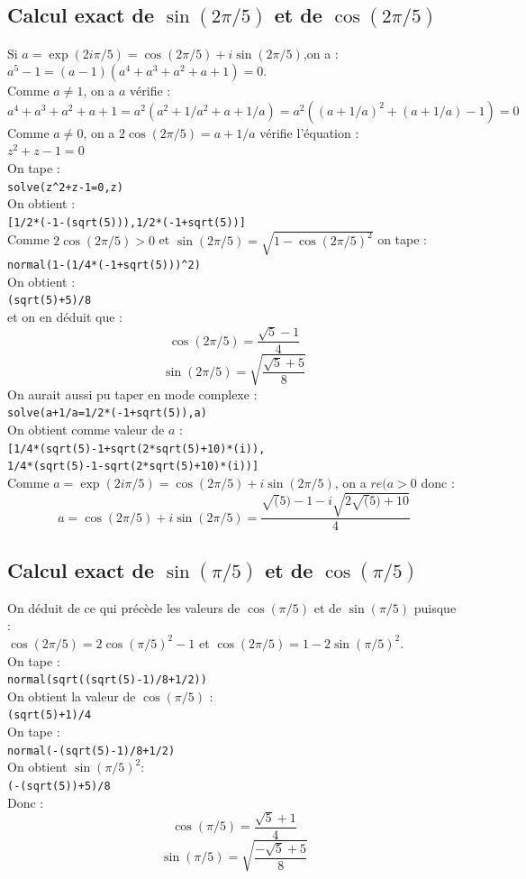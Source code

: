\documentclass[a4paper,11pt]{book}
\begin{document}
\subsection{Calcul exact de $\sin(2\pi/5)$ et de $\cos(2\pi/5)$}
Si $a=\exp(2i\pi/5)=\cos(2\pi/5)+i\sin(2\pi/5)$,on a :\\
$a^5-1=(a-1)(a^4+a^3+a^2+a+1)=0$.\\
Comme $a\neq 1$, on a $a$ v\'erifie :\\ 
$a^4+a^3+a^2+a+1=a^2(a^2+1/a^2+a+1/a)=a^2((a+1/a)^2+(a+1/a)-1)=0$\\
Comme $a\neq 0$, on a $2\cos(2\pi/5)=a+1/a$ v\'erifie l'\'equation :\\
$z^2+z-1=0$\\ 
On tape :\\
{\tt solve(z\verb|^|2+z-1=0,z)}\\
On obtient :\\
{\tt [1/2*(-1-(sqrt(5))),1/2*(-1+sqrt(5))]}\\
Comme $2\cos(2\pi/5)>0$ et $\sin(2\pi/5)=\sqrt{1-\cos(2\pi/5)^2}$ on tape :\\
{\tt normal(1-(1/4*(-1+sqrt(5)))\verb|^|2)}\\
On obtient :\\
{\tt  (sqrt(5)+5)/8}\\
et on en d\'eduit que :
$$\cos(2\pi/5)=\frac{\sqrt 5-1}{4}$$
$$\sin(2\pi/5)=\sqrt{\frac{\sqrt 5+5}{8}}$$
On aurait aussi pu taper en mode complexe :\\
{\tt solve(a+1/a=1/2*(-1+sqrt(5)),a)}\\
On obtient comme valeur de $a$ :\\
{\tt [1/4*(sqrt(5)-1+sqrt(2*sqrt(5)+10)*(i)),\\
1/4*(sqrt(5)-1-sqrt(2*sqrt(5)+10)*(i))] }\\
Comme $a=\exp(2i\pi/5)=\cos(2\pi/5)+i\sin(2\pi/5)$, on a $re(a>0$ donc :\\
$$a=\cos(2\pi/5)+i\sin(2\pi/5)=\frac{\sqrt(5)-1-i\sqrt{2\sqrt(5)+10}}{4}$$ 
\subsection{Calcul exact de $\sin(\pi/5)$ et de $\cos(\pi/5)$}
On  d\'eduit de ce qui pr\'ec\`ede les valeurs de $\cos(\pi/5)$ et de 
$\sin(\pi/5)$ puisque :\\
$\cos(2\pi/5)=2\cos(\pi/5)^2-1$ et $\cos(2\pi/5)=1-2\sin(\pi/5)^2$.\\
On tape :\\
{\tt normal(sqrt((sqrt(5)-1)/8+1/2))}\\
On obtient la valeur de $\cos(\pi/5)$ :\\
{\tt (sqrt(5)+1)/4}\\
On tape :\\
{\tt normal(-(sqrt(5)-1)/8+1/2)}\\
On obtient $\sin(\pi/5)^2$:\\
{\tt (-(sqrt(5))+5)/8}\\
Donc :
$$\cos(\pi/5)=\frac{\sqrt 5+1}{4}$$
$$\sin(\pi/5)=\sqrt{\frac{-\sqrt 5+5}{8}} $$
\end{document}
